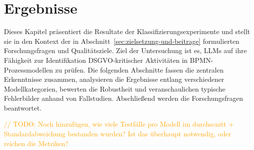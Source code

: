 \chapter{Ergebnisse}\label{ch:ergebnisse}

Dieses Kapitel präsentiert die Resultate der Klassifizierungsexperimente und stellt sie in den Kontext der in Abschnitt~\ref{sec:zielsetzung-und-beitrage} formulierten Forschungsfragen und Qualitätsziele. Ziel der Untersuchung ist es, \acp{LLM} auf ihre Fähigkeit zur Identifikation \ac{DSGVO}-kritischer Aktivitäten in \ac{BPMN}-Prozessmodellen zu prüfen. Die folgenden Abschnitte fassen die zentralen Erkenntnisse zusammen, analysieren die Ergebnisse entlang verschiedener Modellkategorien, bewerten die Robustheit und veranschaulichen typische Fehlerbilder anhand von Fallstudien. Abschließend werden die Forschungsfragen beantwortet.

\textcolor{orange}{// TODO: Noch hinzufügen, wie viele Testfälle pro Modell im durchscnitt + Standardabweichung bestanden wurden? Ist das überhaupt notwendig, oder reichen die Metriken?}






